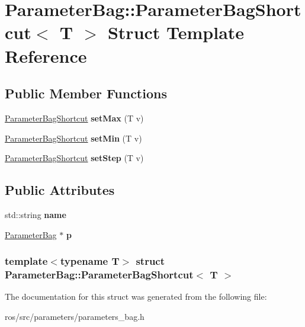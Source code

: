 \hypertarget{structParameterBag_1_1ParameterBagShortcut}{
\section{ParameterBag::ParameterBagShortcut$<$ T $>$ Struct Template Reference}
\label{structParameterBag_1_1ParameterBagShortcut}
}
\subsection*{Public Member Functions}
\begin{DoxyCompactItemize}
\item 
\hypertarget{structParameterBag_1_1ParameterBagShortcut_a84ae8e98fbae020b1cacce1a8398d987}{
\hyperlink{structParameterBag_1_1ParameterBagShortcut}{ParameterBagShortcut} {\bfseries setMax} (T v)}
\label{structParameterBag_1_1ParameterBagShortcut_a84ae8e98fbae020b1cacce1a8398d987}

\item 
\hypertarget{structParameterBag_1_1ParameterBagShortcut_a0a99368a10b8bda439ea8c9f4699e47e}{
\hyperlink{structParameterBag_1_1ParameterBagShortcut}{ParameterBagShortcut} {\bfseries setMin} (T v)}
\label{structParameterBag_1_1ParameterBagShortcut_a0a99368a10b8bda439ea8c9f4699e47e}

\item 
\hypertarget{structParameterBag_1_1ParameterBagShortcut_aefc28bf99c830f7aa85ab1861ea793c2}{
\hyperlink{structParameterBag_1_1ParameterBagShortcut}{ParameterBagShortcut} {\bfseries setStep} (T v)}
\label{structParameterBag_1_1ParameterBagShortcut_aefc28bf99c830f7aa85ab1861ea793c2}

\end{DoxyCompactItemize}
\subsection*{Public Attributes}
\begin{DoxyCompactItemize}
\item 
\hypertarget{structParameterBag_1_1ParameterBagShortcut_add5034da70cd19af07c6cb8cd5a17154}{
std::string {\bfseries name}}
\label{structParameterBag_1_1ParameterBagShortcut_add5034da70cd19af07c6cb8cd5a17154}

\item 
\hypertarget{structParameterBag_1_1ParameterBagShortcut_a2b0c847a34ffd9140a3aa79ff2b21e39}{
\hyperlink{classParameterBag}{ParameterBag} $\ast$ {\bfseries p}}
\label{structParameterBag_1_1ParameterBagShortcut_a2b0c847a34ffd9140a3aa79ff2b21e39}

\end{DoxyCompactItemize}
\subsubsection*{template$<$typename T$>$ struct ParameterBag::ParameterBagShortcut$<$ T $>$}



The documentation for this struct was generated from the following file:\begin{DoxyCompactItemize}
\item 
ros/src/parameters/parameters\_\-bag.h\end{DoxyCompactItemize}
